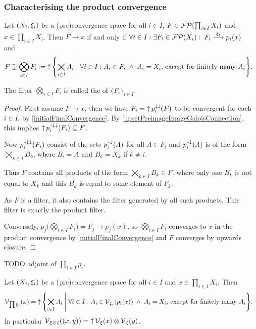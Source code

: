 \subsubsection{Characterising the product convergence}
\begin{proposition} \label{convergenceProductFilter}
Let $\sSet{X_i, \xi_i}$ be a (pre)convergence space for all $i\in I$, $F \in \operatorname{\mathcal{FP}}(\prod_{i\in I}X_i)$ and $x\in \prod_{i\in I}X_i$. Then $F\to x$ \textup{if and only if} $\forall i\in I: \exists F_i\in \operatorname{\mathcal{FP}}(X_i): 
\; F_i \overset{\xi_i}{\longrightarrow} p_i(x)$ and
\[ F \supseteq \bigotimes_{i\in I}F_i \defeq \upset\setbuilder{\bigtimes_{i\in I}A_i}{\forall i\in I: A_i \in F_i \;\land\; A_i = X_i, \,\text{except for finitely many $A_i$}}. \]
\end{proposition}
The filter $\bigotimes_{i\in I}F_i$ is called the  of $\{F_i\}_{i\in I}$.
\begin{proof}
First assume $F\to x$, then we have $F_i = \operatorname{\uparrow} p_i^{\downarrow\downarrow}(F)$ to be convergent for each $i\in I$, by \ref{initialFinalConvergence}. By \ref{upsetPreimageImageGaloisConnection}, this implies $\operatorname{\uparrow} p_i^{{\text{\hspace{0.15em}-}\downarrow}\downarrow}(F_i) \subseteq F$.

Now $p_i^{{\text{\hspace{0.15em}-}\downarrow}\downarrow}(F_i)$ consist of the sets $p_i^{\text{\hspace{0.15em}-}\downarrow}(A)$ for all $A\in F_i$ and $p_i^{\text{\hspace{0.15em}-}\downarrow}(A)$ is of the form $\bigtimes_{k\in I}B_k$, where $B_i = A$ and $B_k = X_k$ if $k \neq i$.

Thus $F$ contains all products of the form $\bigtimes_{k\in I}B_k \in F$, where only one $B_k$ is not equal to $X_k$ and this $B_k$ is equal to some element of $F_k$.

As $F$ is a filter, it also contains the filter generated by all such products. This filter is exactly the product filter.

Conversely, $p_j\Big(\bigotimes_{i\in I}F_i\Big) = F_j \to p_j(x)$, so $\bigotimes_{i\in I}F_i$ converges to $x$ in the product convergence by \ref{initialFinalConvergence} and $F$ converges by upwards closure.
\end{proof}
TODO adjoint of $\coprod_{i\in I}p_i$.
\begin{corollary} \label{productVicinity}
Let $\sSet{X_i, \xi_i}$ be a (pre)convergence space for all $i\in I$ and $x\in \prod_{i\in I}X_i$. Then
\[\vicinity_{\prod \xi_i}(x) = \upset \setbuilder{\bigtimes_{i\in I}A_i}{\forall i\in I: A_i \in \vicinity_{\xi_i}(p_i(x)) \;\land\; A_i = X_i, \,\text{except for finitely many $A_i$}}. \]
In particular $\operatorname{\mathcal{V}}_{\xi\otimes \zeta}((x,y)) = \operatorname{\uparrow} \operatorname{\mathcal{V}}_\xi(x)\otimes \operatorname{\mathcal{V}}_\zeta(y)$.
\end{corollary}

